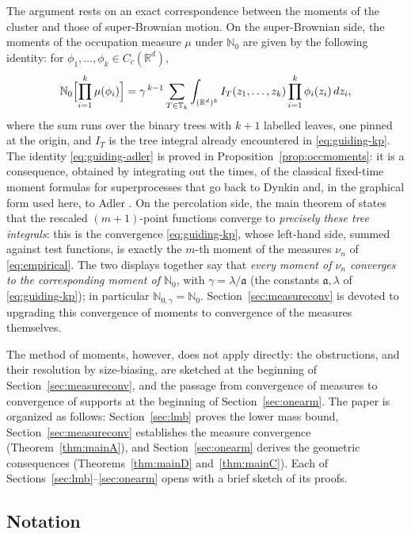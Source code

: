 \documentclass[11pt]{article}
\theoremstyle{definition}
\theoremstyle{remark}
\newcommand{\R}{\mathbb{R}}
\newcommand{\bN}{{\mathbb{N}_0}}                 %
\newcommand{\Ccg}{C_c(\R^d)}                   %
\newcommand{\T}{\mathbb{T}}                    %
\numberwithin{equation}{section}
\theoremstyle{plain}
\theoremstyle{definition}
\theoremstyle{remark}
\theoremstyle{plain}
\begin{document}
The argument rests on an exact correspondence between the moments of the
cluster and those of super-Brownian motion. On the super-Brownian side, the moments of the
occupation measure $\mu$ under $\bN$ are given by the following identity: for
$\phi_1,\dots,\phi_k\in\Ccg$,
\begin{equation}\label{eq:guiding-adler}
\bN\Bigl[\prod_{i=1}^k\mu(\phi_i)\Bigr]
=\gamma^{\,k-1}\sum_{T\in\T_k}\int_{(\R^d)^k}
I_T(z_1,\dots,z_k)\prod_{i=1}^k\phi_i(z_i)\,dz_i ,
\end{equation}
where the sum runs over the binary trees with $k+1$ labelled leaves, one pinned at the origin, and $I_T$ is
the tree integral already encountered in \eqref{eq:guiding-kp}. The
identity \eqref{eq:guiding-adler} is proved in Proposition~\ref{prop:occmoments}: it is
a consequence, obtained by integrating out the times, of the classical
fixed-time moment formulas for superprocesses that go back to Dynkin
\cite{Dyn88} and, in the graphical form used here, to Adler \cite{Adl93}. On
the percolation side, the main theorem of \cite{CCHS26} states that the
rescaled $(m{+}1)$-point functions converge to \emph{precisely these tree
integrals}: this is the convergence \eqref{eq:guiding-kp}, whose left-hand
side, summed against test functions, is exactly the $m$-th moment of the
measures $\nu_n$ of \eqref{eq:empirical}. The two displays together say that
\emph{every moment of $\nu_n$ converges to the corresponding moment of $\bN$},
with $\gamma=\lambda/\mathfrak a$ (the constants $\mathfrak a,\lambda$ of \eqref{eq:guiding-kp}); in particular $\mathbb{N}_{0,\gamma}=\bN$.
Section~\ref{sec:measureconv} is devoted to upgrading this convergence
of moments to convergence of the measures themselves.

%
The method of moments, however, does not apply directly: the obstructions, and
their resolution by size-biasing, are sketched at the beginning of
Section~\ref{sec:measureconv}, and the passage from convergence of measures to
convergence of supports at the beginning of Section~\ref{sec:onearm}. The
paper is organized as follows: Section~\ref{sec:lmb} proves the lower mass
bound, Section~\ref{sec:measureconv} establishes the measure convergence
(Theorem~\ref{thm:mainA}), and Section~\ref{sec:onearm} derives the geometric
consequences (Theorems~\ref{thm:mainD} and~\ref{thm:mainC}). Each of
Sections~\ref{sec:lmb}--\ref{sec:onearm} opens with a brief sketch of its
proofs.


\subsection{Notation}\label{sec:notation}
\end{document}
